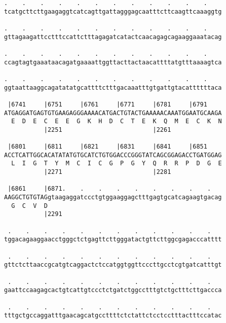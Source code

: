 \documentclass{article}
\begin{document}
\begin{Verbatim}
.    .    .    .    .    .    .    .    .    .    .    .    
tcatgcttcttgaagaggtcatcagttgattagggagcaatttcttcaagttcaaaggtg
                                                            
.    .    .    .    .    .    .    .    .    .    .    .    
gttagaagattcctttccattctttagagatcatactcaacagagcagaaggaaatacag
                                                            
.    .    .    .    .    .    .    .    .    .    .    .    
ccagtagtgaaataacagatgaaaattggttacttactaacattttatgtttaaaagtca
                                                            
.    .    .    .    .    .    .    .    .    .    .    .    
ggtaattaaggcagatatatgcattttctttgacaaatttgtgattgtacattttttaca
                                                            
 |6741     |6751     |6761     |6771     |6781     |6791    
ATGAGGATGAGTGTGAAGAGGGAAAACATGACTGTACTGAAAAACAAATGGAATGCAAGA
  E  D  E  C  E  E  G  K  H  D  C  T  E  K  Q  M  E  C  K  N
           |2251                         |2261              
  
 |6801     |6811     |6821     |6831     |6841     |6851    
ACCTCATTGGCACATATATGTGCATCTGTGGACCCGGGTATCAGCGGAGACCTGATGGAG
  L  I  G  T  Y  M  C  I  C  G  P  G  Y  Q  R  R  P  D  G  E
           |2271                         |2281              
  
 |6861     |6871.    .    .    .    .    .    .    .    .   
AAGGCTGTGTAGgtaagaggatccctgtggaaggagctttgagtgcatcagaagtgacag
  G  C  V  D                                                
           |2291                                            
  
 .    .    .    .    .    .    .    .    .    .    .    .   
tggacagaaggaacctgggctctgagttcttgggatactgttcttggcgagacccatttt
                                                            
 .    .    .    .    .    .    .    .    .    .    .    .   
gttctcttaaccgcatgtcaggactctccatggtggttcccttgcctcgtgatcatttgt
                                                            
 .    .    .    .    .    .    .    .    .    .    .    .   
gaattccaagagcactgtcattgtccctctgatctggcctttgtctgctttcttgaccca
                                                            
 .    .    .    .    .    .    .    .    .    .    .    .   
tttgctgccaggatttgaacagcatgccttttctctattctcctcctttactttccatac
                                                            

\end{Verbatim}
\end{document}
